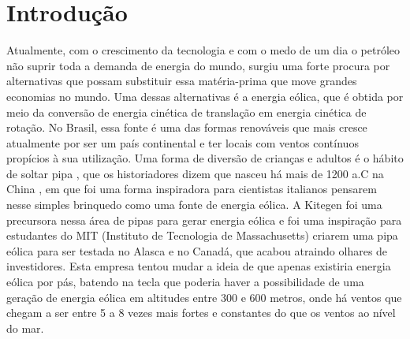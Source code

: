 \chapter*[Introdução]{Introdução}

Atualmente, com o crescimento da tecnologia  e com o medo de um dia o petróleo não suprir toda a demanda de energia do mundo, surgiu uma forte procura por alternativas que possam substituir essa matéria-prima que move grandes economias no mundo. Uma dessas alternativas é a energia eólica, que é obtida por meio da conversão de energia cinética de translação em energia cinética de rotação. No Brasil, essa fonte é uma das formas renováveis que mais cresce atualmente por ser um país continental e ter locais com ventos contínuos propícios à sua utilização.
        	Uma forma de diversão de crianças e adultos é o hábito de soltar pipa , que os historiadores dizem que nasceu há mais de 1200 a.C na China , em que foi uma forma inspiradora para cientistas italianos pensarem nesse simples brinquedo como uma fonte de energia eólica.  A Kitegen foi uma precursora nessa área de pipas para gerar energia eólica e foi uma inspiração para estudantes do MIT (Instituto de Tecnologia de Massachusetts) criarem uma pipa eólica para ser testada no Alasca e no Canadá, que acabou atraindo olhares de investidores. Esta empresa tentou mudar a ideia de que apenas existiria energia eólica por pás, batendo na tecla que poderia haver a possibilidade de uma geração de energia eólica em altitudes entre 300 e 600 metros, onde há ventos que chegam a ser entre 5 a 8 vezes mais fortes e constantes do que os ventos ao nível do mar.
